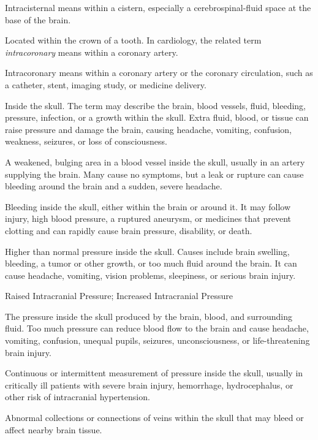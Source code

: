  Intracisternal means within a cistern, especially a cerebrospinal-fluid space at the base of the brain.

 Located within the crown of a tooth. In cardiology, the related term \textit{intracoronary} means within a coronary artery.

 Intracoronary means within a coronary artery or the coronary circulation, such as a catheter, stent, imaging study, or medicine delivery.

 Inside the skull. The term may describe the brain, blood vessels, fluid, bleeding, pressure, infection, or a growth within the skull. Extra fluid, blood, or tissue can raise pressure and damage the brain, causing headache, vomiting, confusion, weakness, seizures, or loss of consciousness.

 A weakened, bulging area in a blood vessel inside the skull, usually in an artery supplying the brain. Many cause no symptoms, but a leak or rupture can cause bleeding around the brain and a sudden, severe headache.

 Bleeding inside the skull, either within the brain or around it. It may follow injury, high blood pressure, a ruptured aneurysm, or medicines that prevent clotting and can rapidly cause brain pressure, disability, or death.

 Higher than normal pressure inside the skull. Causes include brain swelling, bleeding, a tumor or other growth, or too much fluid around the brain. It can cause headache, vomiting, vision problems, sleepiness, or serious brain injury.

\synonyms
Raised Intracranial Pressure; Increased Intracranial Pressure

 The pressure inside the skull produced by the brain, blood, and surrounding fluid. Too much pressure can reduce blood flow to the brain and cause headache, vomiting, confusion, unequal pupils, seizures, unconsciousness, or life-threatening brain injury.

 Continuous or intermittent measurement of pressure inside the skull, usually in critically ill patients with severe brain injury, hemorrhage, hydrocephalus, or other risk of intracranial hypertension.

 Abnormal collections or connections of veins within the skull that may bleed or affect nearby brain tissue.

